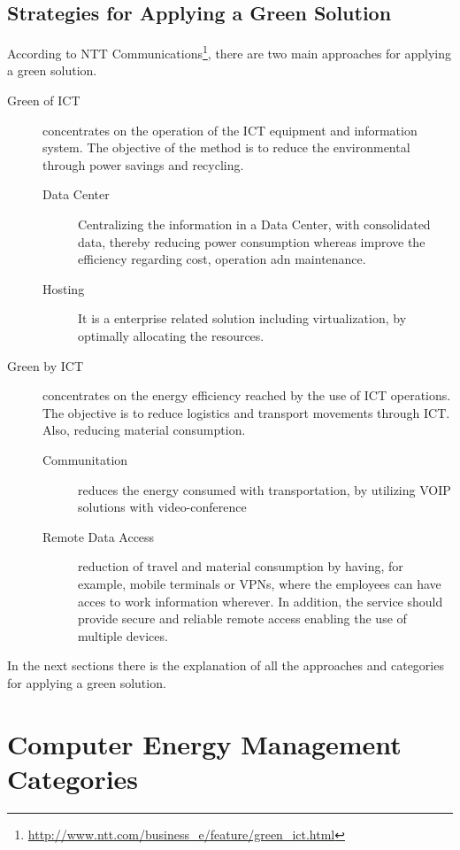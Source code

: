 {        \subsection{Strategies for Applying a Green Solution} \label{sec2:strategies_applying_green_solution}
            According to NTT Communications\footnote{\url{http://www.ntt.com/business_e/feature/green_ict.html}}, there are two main approaches for applying a green solution.
            \begin{description}
            	\item[Green of ICT] concentrates on the operation of the ICT equipment and information system. The objective of the method is to reduce the environmental through power savings and recycling.
                	\begin{description}
                		\item[Data Center] Centralizing the information in a Data Center, with consolidated data, thereby reducing power consumption whereas improve the efficiency regarding cost, operation adn maintenance.
                		\item[Hosting] It is a enterprise related solution including virtualization, by optimally allocating the resources.
                	\end{description}
            	\item[Green by ICT] concentrates on the energy efficiency reached by the use of ICT operations. The objective is to reduce logistics and transport movements through ICT. Also, reducing material consumption.
            	    \begin{description}
            	    	\item[Communitation] reduces the energy consumed with transportation, by utilizing VOIP solutions with video-conference
            	    	\item[Remote Data Access] reduction of travel and material consumption by having, for example, mobile terminals or VPNs, where the employees can have acces to work information wherever. In addition, the service should provide secure and reliable remote access enabling the use of multiple devices.
            	    \end{description}
            \end{description}
            In the next sections there is the explanation of all the approaches and categories for applying a green solution.
            
    \section{Computer Energy Management Categories} \label{sec2:energy_categories}

}
